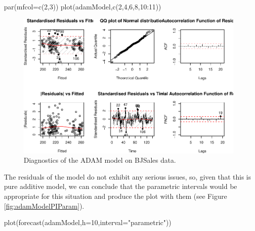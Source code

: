 \documentclass[
]{book}
\newenvironment{Shaded}{\begin{snugshade}}{\end{snugshade}}
\newcommand{\AttributeTok}[1]{\textcolor[rgb]{0.77,0.63,0.00}{#1}}
\newcommand{\DecValTok}[1]{\textcolor[rgb]{0.00,0.00,0.81}{#1}}
\newcommand{\FunctionTok}[1]{\textcolor[rgb]{0.00,0.00,0.00}{#1}}
\newcommand{\NormalTok}[1]{#1}
\newcommand{\SpecialCharTok}[1]{\textcolor[rgb]{0.00,0.00,0.00}{#1}}
\newcommand{\StringTok}[1]{\textcolor[rgb]{0.31,0.60,0.02}{#1}}
\theoremstyle{definition}
\theoremstyle{definition}
\theoremstyle{definition}
\theoremstyle{definition}
\theoremstyle{remark}
\begin{document}
\begin{Shaded}
\begin{Highlighting}[]
\FunctionTok{par}\NormalTok{(}\AttributeTok{mfcol=}\FunctionTok{c}\NormalTok{(}\DecValTok{2}\NormalTok{,}\DecValTok{3}\NormalTok{))}
\FunctionTok{plot}\NormalTok{(adamModel,}\FunctionTok{c}\NormalTok{(}\DecValTok{2}\NormalTok{,}\DecValTok{4}\NormalTok{,}\DecValTok{6}\NormalTok{,}\DecValTok{8}\NormalTok{,}\DecValTok{10}\SpecialCharTok{:}\DecValTok{11}\NormalTok{))}
\end{Highlighting}
\end{Shaded}

\begin{figure}
\centering
\includegraphics{adam_files/figure-latex/adamModelDiagnostics-1.pdf}
\caption{\label{fig:adamModelDiagnostics}Diagnostics of the ADAM model on BJSales data.}
\end{figure}

The residuals of the model do not exhibit any serious issues, so, given that this is pure additive model, we can conclude that the parametric intervals would be appropriate for this situation and produce the plot with them (see Figure \ref{fig:adamModelPIParam}).

\begin{Shaded}
\begin{Highlighting}[]
\FunctionTok{plot}\NormalTok{(}\FunctionTok{forecast}\NormalTok{(adamModel,}\AttributeTok{h=}\DecValTok{10}\NormalTok{,}\AttributeTok{interval=}\StringTok{"parametric"}\NormalTok{))}
\end{Highlighting}
\end{Shaded}
\end{document}
